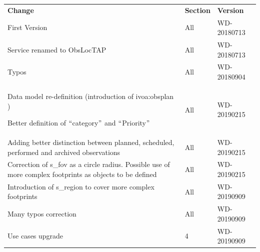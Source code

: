 \documentclass[11pt,a4paper]{ivoa}
\begin{document}
\begin{table}[H]
 			\centering
\begin{tabular}{p{3.75in}p{0.92in}p{0.8in}}
\hline
\multicolumn{1}{|p{3.75in}}{\textbf{Change}} & 
\multicolumn{1}{|p{0.72in}}{\textbf{Section}} & 
\multicolumn{1}{|p{0.9in}|}{\textbf{Version}} \\
\multicolumn{1}{|p{3.75in}}{First Version} & 
\multicolumn{1}{|p{0.72in}}{All} & 
\multicolumn{1}{|p{0.9in}|}{{\fontsize{10pt}{12.0pt}\selectfont WD-20180713}} \\
\multicolumn{1}{|p{3.75in}}{Service renamed to ObsLocTAP} & 
\multicolumn{1}{|p{0.72in}}{All} & 
\multicolumn{1}{|p{0.9in}|}{{\fontsize{10pt}{12.0pt}\selectfont WD-20180713}} \\
\multicolumn{1}{|p{3.75in}}{Typos} & 
\multicolumn{1}{|p{0.72in}}{All} & 
\multicolumn{1}{|p{0.9in}|}{{\fontsize{10pt}{12.0pt}\selectfont WD-20180904}} \\
\multicolumn{1}{|p{3.75in}}{Data model re-definition (introduction of ivoa:obsplan ) \par Better definition of $``$category$"$  and $``$Priority$"$ } & 
\multicolumn{1}{|p{0.72in}}{All} & 
\multicolumn{1}{|p{0.9in}|}{{\fontsize{10pt}{12.0pt}\selectfont WD-20190215}} \\
\multicolumn{1}{|p{3.75in}}{Adding better distinction between planned, scheduled, performed and archived observations} & 
\multicolumn{1}{|p{0.72in}}{All} & 
\multicolumn{1}{|p{0.9in}|}{{\fontsize{10pt}{12.0pt}\selectfont WD-20190215}} \\
\multicolumn{1}{|p{3.75in}}{Correction of s\_fov as a circle radius. Possible use of more complex footprints as objects to be defined} & 
\multicolumn{1}{|p{0.72in}}{All} & 
\multicolumn{1}{|p{0.9in}|}{{\fontsize{10pt}{12.0pt}\selectfont WD-20190215}} \\
\multicolumn{1}{|p{3.75in}}{Introduction of s\_region to cover more complex footprints} & 
\multicolumn{1}{|p{0.72in}}{All} & 
\multicolumn{1}{|p{0.9in}|}{{\fontsize{10pt}{12.0pt}\selectfont WD-20190909}} \\
\multicolumn{1}{|p{3.75in}}{Many typos correction} & 
\multicolumn{1}{|p{0.72in}}{All} & 
\multicolumn{1}{|p{0.9in}|}{{\fontsize{10pt}{12.0pt}\selectfont WD-20190909}} \\
\multicolumn{1}{|p{3.75in}}{Use cases upgrade} & 
\multicolumn{1}{|p{0.72in}}{4} & 
\multicolumn{1}{|p{0.9in}|}{{\fontsize{10pt}{12.0pt}\selectfont WD-20190909}} \\

\end{tabular}
\end{table}
\end{document}
